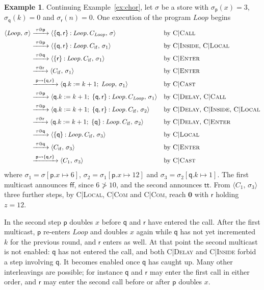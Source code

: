 \documentclass[11pt]{article}
\makeatletter
\theoremstyle{plain}
\theoremstyle{definition}
\newtheorem{example}[theorem]{Example}
\theoremstyle{remark}
\newcommand{\nil}{\mathbf{0}}
\newcommand{\ttrue}{\mathsf{tt}}
\newcommand{\ffalse}{\mathsf{ff}}
\newcommand{\seq}{;\;}
\newcommand{\pp}{\mathsf{p}}
\newcommand{\qq}{\mathsf{q}}
\newcommand{\rr}{\mathsf{r}}
\newcommand{\conf}[2]{\langle #1,\, #2\rangle}
\newcommand{\lto}[1]{\xrightarrow{\;#1\;}}
\newcommand{\tauat}[1]{\tau\mathord{@}#1}
\newcommand{\cast}[2]{#1 \rightsquigarrow #2}
\newcommand{\upd}[3]{#1[#2 \mapsto #3]}
\newcommand{\rn}[1]{{\normalfont\scshape #1}}
\newcommand{\rt}[3]{#1\mathbin{:}#2.\,#3}
\newcommand{\Loop}{\mathit{Loop}}
\newcommand{\Cif}{C_{\mathrm{if}}}
\newcommand{\CL}{C_{\Loop}}
\makeatother
\begin{document}
\begin{example}\label{ex:run}
  Continuing Example~\ref{ex:chor}, let $\sigma$ be a store with
  $\sigma_\pp(x) = 3$, $\sigma_\qq(k) = 0$ and $\sigma_\rr(n) = 0$.  One
  execution of the program $\Loop$ begins
  \begin{align*}
    \conf{\Loop}{\sigma}
      &\lto{\tauat{\pp}} \conf{\rt{\{\qq,\rr\}}{\Loop}{\CL}}{\sigma}
      && \text{by \rn{C|Call}}\\
      &\lto{\tauat{\pp}} \conf{\rt{\{\qq,\rr\}}{\Loop}{\Cif}}{\sigma_1}
      && \text{by \rn{C|Inside}, \rn{C|Local}}\\
      &\lto{\tauat{\qq}} \conf{\rt{\{\rr\}}{\Loop}{\Cif}}{\sigma_1}
      && \text{by \rn{C|Enter}}\\
      &\lto{\tauat{\rr}} \conf{\Cif}{\sigma_1}
      && \text{by \rn{C|Enter}}\\
      &\lto{\cast{\pp}{\{\qq,\rr\}}} \conf{\qq.k := k+1 \seq \Loop}{\sigma_1}
      && \text{by \rn{C|Cast}}\\
      &\lto{\tauat{\pp}} \conf{\qq.k := k+1 \seq \rt{\{\qq,\rr\}}{\Loop}{\CL}}{\sigma_1}
      && \text{by \rn{C|Delay}, \rn{C|Call}}\\
      &\lto{\tauat{\pp}} \conf{\qq.k := k+1 \seq \rt{\{\qq,\rr\}}{\Loop}{\Cif}}{\sigma_2}
      && \text{by \rn{C|Delay}, \rn{C|Inside}, \rn{C|Local}}\\
      &\lto{\tauat{\rr}} \conf{\qq.k := k+1 \seq \rt{\{\qq\}}{\Loop}{\Cif}}{\sigma_2}
      && \text{by \rn{C|Delay}, \rn{C|Enter}}\\
      &\lto{\tauat{\qq}} \conf{\rt{\{\qq\}}{\Loop}{\Cif}}{\sigma_3}
      && \text{by \rn{C|Local}}\\
      &\lto{\tauat{\qq}} \conf{\Cif}{\sigma_3}
      && \text{by \rn{C|Enter}}\\
      &\lto{\cast{\pp}{\{\qq,\rr\}}} \conf{C_1}{\sigma_3}
      && \text{by \rn{C|Cast}}
  \end{align*}
  where $\sigma_1 = \upd{\sigma}{\pp.x}{6}$,
  $\sigma_2 = \upd{\sigma_1}{\pp.x}{12}$ and
  $\sigma_3 = \upd{\sigma_2}{\qq.k}{1}$.  The first multicast announces
  $\ffalse$, since $6 \not> 10$, and the second announces $\ttrue$.  From
  $\conf{C_1}{\sigma_3}$ three further steps, by \rn{C|Local}, \rn{C|Com}
  and \rn{C|Com}, reach $\nil$ with $\rr$ holding $z = 12$.

  In the second step $\pp$ doubles $x$ before $\qq$ and $\rr$ have entered
  the call.  After the first multicast, $\pp$ re-enters $\Loop$ and doubles
  $x$ again while $\qq$ has not yet incremented $k$ for the previous round,
  and $\rr$ enters as well.  At that point the second multicast is not
  enabled: $\qq$ has not entered the call, and both \rn{C|Delay} and
  \rn{C|Inside} forbid a step involving $\qq$.  It becomes enabled once $\qq$
  has caught up.  Many other interleavings are possible; for instance $\qq$
  and $\rr$ may enter the first call in either order, and $\rr$ may enter the
  second call before or after $\pp$ doubles $x$.
\end{example}
\end{document}
